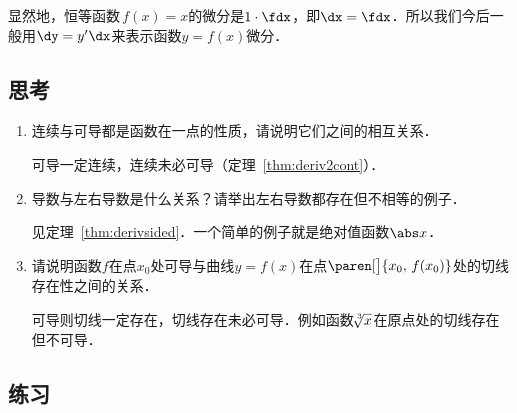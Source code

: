 \begin{remark}
  显然地，恒等函数\(\,f(x) = x\)的微分是\(1 \cdot \fdx\)，即\(\dx = \fdx\)．所以我们今后一般用\(\dy = y' \dx\)来表示函数\(y = f(x)\)微分．
\end{remark}


\subsection*{思考}

\begin{enumerate}
\item 连续与可导都是函数在一点的性质，请说明它们之间的相互关系．

  \ifshowsolp
  可导一定连续，连续未必可导（定理~\ref{thm:deriv2cont}）．
  \fi

\item 导数与左右导数是什么关系？请举出左右导数都存在但不相等的例子．

  \ifshowsolp
  见定理~\ref{thm:derivsided}．一个简单的例子就是绝对值函数\(\abs x\)．
  \fi

\item 请说明函数\(f\)在点\(x_0\)处可导与曲线\(y = f(x)\)在点\(\paren[\big]{x_0, \,f(x_0)}\)处的切线存在性之间的关系．

  \ifshowsolp
  可导则切线一定存在，切线存在未必可导．例如函数\(\!\sqrt[\leftroot{-2}\uproot{2}3] x\)在原点处的切线存在但不可导．
  \fi
\end{enumerate}

\ifshowex
{}
\subsection*{练习}
\label{B1.4.1.E}

